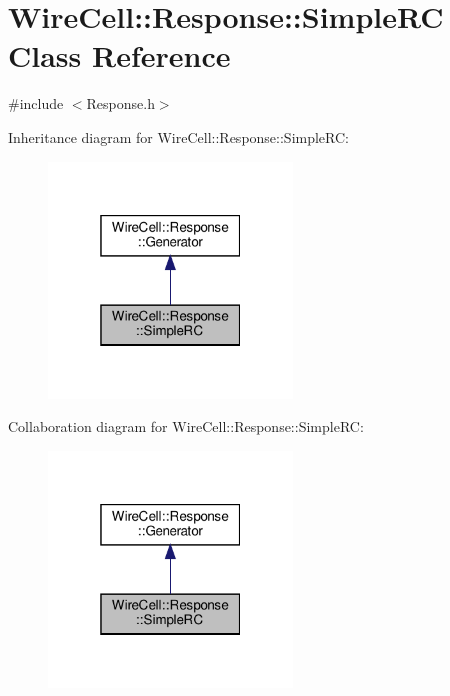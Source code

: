 \hypertarget{class_wire_cell_1_1_response_1_1_simple_r_c}{}\section{Wire\+Cell\+:\+:Response\+:\+:Simple\+RC Class Reference}
\label{class_wire_cell_1_1_response_1_1_simple_r_c}


{\ttfamily \#include $<$Response.\+h$>$}



Inheritance diagram for Wire\+Cell\+:\+:Response\+:\+:Simple\+RC\+:
\nopagebreak
\begin{figure}[H]
\begin{center}
\leavevmode
\includegraphics[width=184pt]{class_wire_cell_1_1_response_1_1_simple_r_c__inherit__graph}
\end{center}
\end{figure}


Collaboration diagram for Wire\+Cell\+:\+:Response\+:\+:Simple\+RC\+:
\nopagebreak
\begin{figure}[H]
\begin{center}
\leavevmode
\includegraphics[width=184pt]{class_wire_cell_1_1_response_1_1_simple_r_c__coll__graph}
\end{center}
\end{figure}
